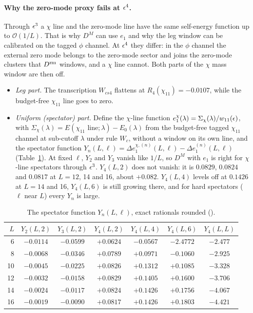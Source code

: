 \paragraph{Why the zero-mode proxy fails at $\epsilon^4$.} Through $\epsilon^3$ a $\chi$ line and the zero-mode line have the same
self-energy function up to $\mathcal O(1/L)$. That is why $D^M$ can use $e_1$ and why the leg window can be calibrated on the
tagged $\phi$ channel. At $\epsilon^4$ they differ: in the $\phi$ channel the external zero mode belongs to the zero-mode sector and
joins the zero-mode clusters that $D^{\rm zm}$ windows, and a $\chi$ line cannot. Both parts of the $\chi$ mass window are then
off.
\begin{itemize}
\item \emph{Leg part.} The transcription $W_{cs4}$ flattens at $R_4(\chi_{11})=-0.0107$, while the budget-free $\chi_{11}$
 line goes to zero.
\item \emph{Uniform (spectator) part.} Define the $\chi$-line function $e_1^\chi(\lambda)=\Sigma_\chi(\lambda)/w_{11}(\epsilon)$, with
 $\Sigma_\chi(\lambda)=E(\chi_{11}\text{ line};\lambda)-E_0(\lambda)$ from the budget-free tagged $\chi_{11}$ channel at sub-cutoff
 $\lambda$ under rule $W_c$, without a window on its own line, and the spectator function
 $Y_n(L,\ell)=\Delta e_1^{\chi,(n)}(L,\ell)-\Delta e_1^{(n)}(L,\ell)$ (Table~\ref{htp:d2:tab:Y4}). At fixed $\ell$, $Y_2$ and $Y_3$
 vanish like $1/L$, so $D^M$ with $e_1$ is right for $\chi$-line spectators through $\epsilon^3$. $Y_4(L,2)$ does not vanish: it is
 $0.0829$, $0.0824$ and $0.0817$ at $L=12$, 14 and 16, about $+0.082$. $Y_4(L,4)$ levels off at $0.1426$ at $L=14$ and 16, $Y_4(L,6)$ is still
 growing there, and for hard spectators ($\ell$ near $L$) every $Y_n$ is large.
\end{itemize}

\begin{table}[ht]
\centering\footnotesize\renewcommand{\arraystretch}{1.15}
\begin{tabular}{@{}rcccccc@{}}
\toprule
$L$ & $Y_2(L,2)$ & $Y_3(L,2)$ & $Y_4(L,2)$ & $Y_4(L,4)$ & $Y_4(L,6)$ & $Y_4(L,L)$ \\\midrule
6 & $-0.0114$ & $-0.0599$ & $+0.0624$ & $-0.0567$ & $-2.4772$ & $-2.477$ \\
8 & $-0.0068$ & $-0.0346$ & $+0.0789$ & $+0.0971$ & $-0.1060$ & $-2.925$ \\
10 & $-0.0045$ & $-0.0225$ & $+0.0826$ & $+0.1312$ & $+0.1085$ & $-3.328$ \\
12 & $-0.0032$ & $-0.0158$ & $+0.0829$ & $+0.1405$ & $+0.1600$ & $-3.706$ \\
14 & $-0.0024$ & $-0.0117$ & $+0.0824$ & $+0.1426$ & $+0.1756$ & $-4.067$ \\
16 & $-0.0019$ & $-0.0090$ & $+0.0817$ & $+0.1426$ & $+0.1803$ & $-4.421$ \\
\bottomrule
\end{tabular}
\caption{The spectator function $Y_n(L,\ell)$, exact rationals rounded ().}
\label{htp:d2:tab:Y4}
\end{table}

